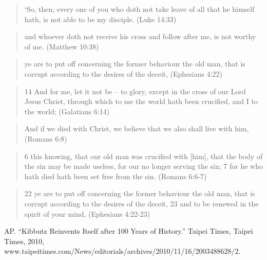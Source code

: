 \documentclass[11pt]{article}
\begin{document}
\begin{thebibliography}{37}
\begin{quote}
`So, then, every one of you who doth not take leave of all that he himself hath, is not able to be my disciple.
(Luke 14:33)
\end{quote}
\begin{quote}
and whoever doth not receive his cross and follow after me, is not worthy of me.
(Matthew 10:38)
\end{quote}
\begin{quote}
ye are to put off concerning the former behaviour the old man, that is corrupt according to the desires of the deceit,
(Ephesians 4:22)
\end{quote}
\begin{quote}
14 And for me, let it not be -- to glory, except in the cross of our Lord Jesus Christ, through which to me the world hath been crucified, and I to the world;
(Galatians 6:14)
\end{quote}
\begin{quote}
And if we died with Christ, we believe that we also shall live with him,
(Romans 6:8)
\end{quote}
\begin{quote}
6 this knowing, that our old man was crucified with [him], that the body of the sin may be made useless, for our no longer serving the sin;
7 for he who hath died hath been set free from the sin.
(Romans 6:6-7)
\end{quote}
\begin{quote}
22 ye are to put off concerning the former behaviour the old man, that is corrupt according to the desires of the deceit,
23 and to be renewed in the spirit of your mind,
(Ephesians 4:22-23)
\end{quote}

AP. “Kibbutz Reinvents Itself after 100 Years of History.” Taipei Times, Taipei Times, 2010, www.taipeitimes.com/News/editorials/archives/2010/11/16/2003488628/2.


\end{thebibliography}
\end{document}
